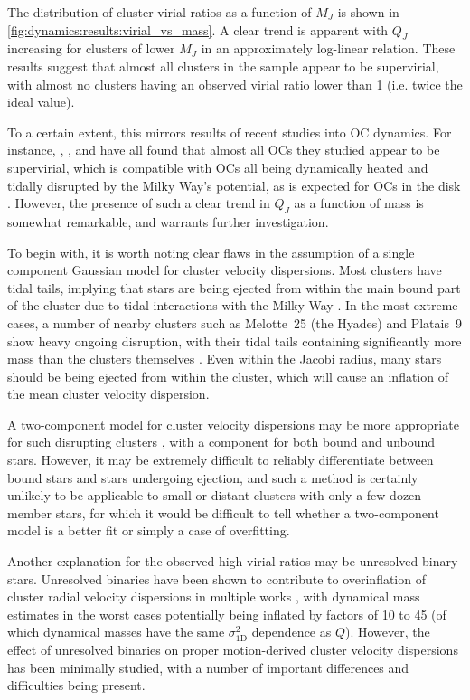 The distribution of cluster virial ratios as a function of $M_J$ is shown in \ref{fig:dynamics:results:virial_vs_mass}. A clear trend is apparent with $Q_J$ increasing for clusters of lower $M_J$ in an approximately log-linear relation. These results suggest that almost all clusters in the sample appear to be supervirial, with almost no clusters having an observed virial ratio lower than 1 (i.e. twice the ideal value).

To a certain extent, this mirrors results of recent studies into OC dynamics. For instance, \cite{bravi_gaia-eso_2018}, \cite{kuhn_kinematics_2019}, and \cite{pang_3d_2021} have all found that almost all OCs they studied appear to be supervirial, which is compatible with OCs all being dynamically heated and tidally disrupted by the Milky Way's potential, as is expected for OCs in the disk \citep{krause_physics_2020}. However, the presence of such a clear trend in $Q_J$ as a function of mass is somewhat remarkable, and warrants further investigation.

To begin with, it is worth noting clear flaws in the assumption of a single component Gaussian model for cluster velocity dispersions. Most clusters have tidal tails, implying that stars are being ejected from within the main bound part of the cluster due to tidal interactions with the Milky Way \citep{meingast_extended_2021,tarricq_structural_2022}. In the most extreme cases, a number of nearby clusters such as Melotte~25 (the Hyades) and Platais~9 show heavy ongoing disruption, with their tidal tails containing significantly more mass than the clusters themselves \citep{oh_kinematic_modelling_2020,meingast_extended_2021}. Even within the Jacobi radius, many stars should be being ejected from within the cluster, which will cause an inflation of the mean cluster velocity dispersion. 

A two-component model for cluster velocity dispersions may be more appropriate for such disrupting clusters \citep[see e.g.][]{kuhn_kinematics_2019}, with a component for both bound and unbound stars. However, it may be extremely difficult to reliably differentiate between bound stars and stars undergoing ejection, and such a method is certainly unlikely to be applicable to small or distant clusters with only a few dozen member stars, for which it would be difficult to tell whether a two-component model is a better fit or simply a case of overfitting.

Another explanation for the observed high virial ratios may be unresolved binary stars. Unresolved binaries have been shown to contribute to overinflation of cluster radial velocity dispersions in multiple works \citep[e.g.][]{gieles_velocity_2010,rastello_effect_binarity_2020}, with dynamical mass estimates in the worst cases potentially being inflated by factors of 10 to 45 (of which dynamical masses have the same $\sigma_\text{1D}^2$ dependence as $Q$). However, the effect of unresolved binaries on proper motion-derived cluster velocity dispersions has been minimally studied, with a number of important differences and difficulties being present.


